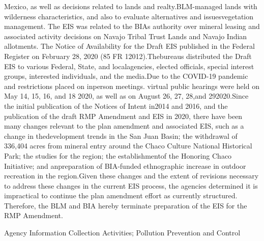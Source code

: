 \documentclass{article}
\begin{document}
Mexico, as well as decisions related to
lands and realty.BLM-managed lands
with wilderness characteristics, and
also to evaluate alternatives and issuesvegetation management. The EIS was
related to the BIAs authority over
mineral leasing and associated activity
decisions on Navajo Tribal Trust Lands
and Navajo Indian allotments. The
Notice of Availability for the Draft EIS
published in the Federal Register on
February 28, 2020 (85 FR 12012).Thebureaus distributed the Draft EIS to
various Federal, State, and localagencies, elected officials, special
interest groups, interested individuals,
and the media.Due to the COVID-19
pandemic and restrictions placed on inperson meetings. virtual public hearings
were held on May 14, 15, 16, and 18
2020, as well as on August 26, 27, 28,and 292020.Since the initial
publication of the Notices of Intent in2014 and 2016, and the publication of
the draft RMP Amendment and EIS in
2020, there have been many changes
relevant to the plan amendment and
associated EIS, such as a change in thedevelopment trends in the San Juan
Basin; the withdrawal of 336,404 acres
from mineral entry around the Chaco
Culture National Historical Park; the
studies for the region; the establishmentof the Honoring Chaco Initiative; and anpreparation of BIA-funded ethnographic
increase in outdoor recreation in the
region.Given these changes and the
extent of revisions necessary to address
these changes in the current EIS
process, the agencies determined it is
impractical to continue the plan
amendment effort as currently
structured. Therefore, the BLM and BIA
hereby terminate preparation of the EIS
for the RMP Amendment.


Agency Information Collection
Activities; Pollution Prevention and
Control
\end{document}
